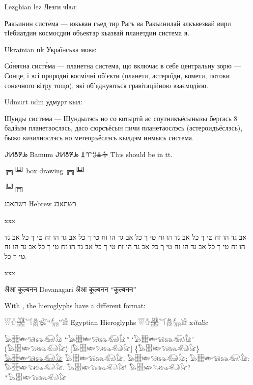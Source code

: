 \documentclass{article}
\newcommand\formathiero{%
		\fthiero 
		\addfontfeatures{Colour=brown,Scale=2}%
}
\begin{document}
\begin{xuchare}
Lezghian lez Лезги чӏал:

Ракъинин систе́ма — юкьван гъед тир Рагъ ва Ракъинилай элкъвезвай вири тӀебиатдин космосдин объектар кьазвай планетдин система я.

Ukrainian uk Українська мова:

Со́нячна систе́ма — планетна система, що включає в себе центральну зорю — Сонце, і всі природні космічні об'єкти (планети, астероїди, комети, потоки сонячного вітру тощо), які об'єднуються гравітаційною взаємодією.

Udmurt udm удмурт кыл:

Шунды система — Шундылэсь но со котыртӥ ас спутникъёсынызы бергась 8 бадӟым планетаослэсь, дасо сюрсъёсын пичи планетаослэсь (астероидъёслэсь), быжо кизилиослэсь но метеоръёслэсь кылдэм инмысь система.

ꚠꚡꚢꚣꚤ Bamum ꚠꚡꚢꚣꚤ  \ttfamily 𖦳𖦴𖧣𖠳𖡒   This should be in tt.

╔╗╚╝  box drawing ╔╗╚╝

╚╝╔╗

\rmfamily

  רשתאבג  Hebrew   רשתאבג  

xxx\par

אב גד הו זח טי ך כל אב גד הו זח טי ך כל אב גד הו זח טי ך כל אב גד הו זח טי ך כל אב גד הו זח טי ך כל אב גד הו זח טי ך כל אב גד הו זח טי ך כל אב גד הו זח טי ך כל אב גד הו זח טי ך כל.

xxx


ऄआ कूल्बनन Devanagari ऄआ कूल्बनन ``कूल्बनन''

\renewcommand\formathiero{ 	\fthiero 
\addfontfeatures{Colour=violet} }
With \detokenize{\renewcommand\formathiero{	\fthiero \addfontfeatures{Colour=violet}}}, the hieroglyphs have a different format:

𓍦𓍠𓈤𓆔𓆣𓆤``𓃲''𓀀 Egyptian Hieroglyphs 𓍦𓍠𓈤𓆔𓆣𓃲𓀀 x\textit{italic}

𓅃𓇃𓆧𓃔𓃬𓃰𓃠 ``𓅃𓇃𓆧𓃔𓃬𓃰𓃠'' `𓅃𓇃𓆧𓃔𓃬𓃰𓃠' (𓅃𓇃𓆧𓃔𓃬𓃰𓃠) [𓅃𓇃𓆧𓃔𓃬𓃰𓃠] \{𓅃𓇃𓆧𓃔𓃬𓃰𓃠\}\underline{𓅃𓇃𓆧𓃔𓃬𓃰𓃠} 𓅃𓇃𓆧𓃔𓃬𓃰𓃠, 𓅃𓇃𓆧𓃔𓃬𓃰𓃠; 𓅃𓇃𓆧𓃔𓃬𓃰𓃠: 𓅃𓇃𓆧𓃔𓃬𓃰𓃠. 𓅃𓇃𓆧𓃔𓃬𓃰𓃠! 𓅃𓇃𓆧𓃔𓃬𓃰𓃠? {*}𓅃𓇃𓆧𓃔𓃬𓃰𓃠


\end{xuchare}
\end{document}
